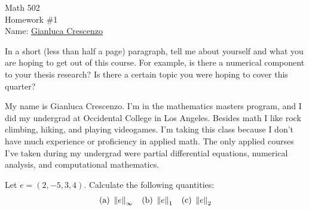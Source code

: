 \documentclass[12pt,twoside,openany]{memoir}
\begin{document}
\begin{center}
    {\Large Math 502 \\[0.1in]Homework \#1}\\[.175in]
    {Name:} {\underline{Gianluca Crescenzo\hspace*{2in}}}\\[0.15in]
    \end{center}
    \vspace{4pt}
\begin{exercise}[manual-num={0}]
In a short (less than half a page) paragraph, tell me about yourself and what you are hoping to get out
of this course. For example, is there a numerical component to your thesis research? Is there a certain
topic you were hoping to cover this quarter?
\end{exercise}

\begin{answer}
My name is Gianluca Crescenzo. I'm in the mathematics masters program, and I did my undergrad at Occidental College in Los Angeles. Besides math I like rock climbing, hiking, and playing videogames. I'm taking this class because I don't have much experience or proficiency in applied math. The only applied courses I've taken during my undergrad were partial differential equations, numerical analysis, and computational mathematics.
\end{answer}
\begin{exercise}[manual-num={A.1}]
Let $e = (2,-5,3,4)$. Calculate the following quantities:
    \begin{equation*}
    \begin{split}
        \text{(a)}\h3\lnorm e \rnorm_\infty\h9\text{(b)}\h3\lnorm e \rnorm_1\h9\text{(c)}\h3\lnorm e \rnorm_2
    \end{split}
    \end{equation*}
\end{exercise}
\end{document}
